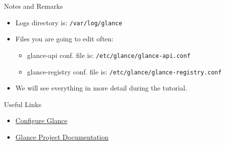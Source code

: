 \documentclass[english,serif,mathserif]{beamer}
\begin{document}
\begin{frame}{Notes and Remarks}

\begin{itemize}
\item Logs directory is: \texttt{/var/log/glance} 
\item Files you are going to edit often:
      \begin{itemize}
        \item glance-api conf. file is: \texttt{/etc/glance/glance-api.conf}
        \item glance-registry conf. file is: \texttt{/etc/glance/glance-registry.conf}
      \end{itemize}
\item We will see everything in more detail during the tutorial.
\end{itemize}

\end{frame}

\begin{frame}{Useful Links}

\begin{itemize}
\item \href{http://docs.openstack.org/trunk/config-reference/content/ch\_configuring-openstack-image-service.html}{Configure Glance}
\item \href{http://docs.openstack.org/developer/glance/}{Glance Project Documentation}
\end{itemize}

\end{frame}
\end{document}
